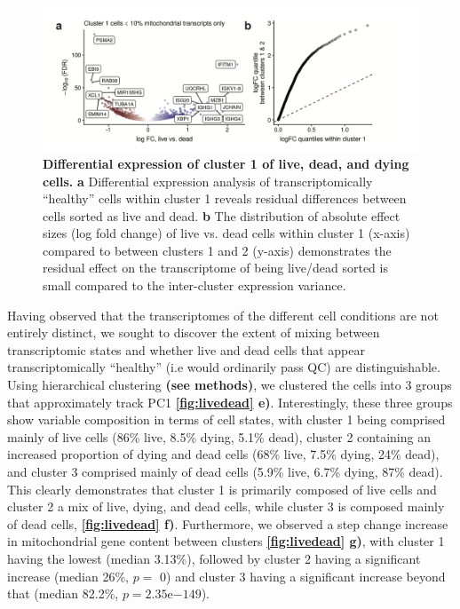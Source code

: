 \begin{figure}
	\centering
	\includegraphics[width=\textwidth]{Figures/chap3/livedead2.png}
	\caption[Differential expression of cluster 1 of live, dead, and dying cells.]
	{\small
	 \textbf{Differential expression of cluster 1 of live, dead, and dying cells.}
    \textbf{a} Differential expression analysis of transcriptomically ``healthy'' cells within cluster 1 reveals residual differences between cells sorted as live and dead.
    \textbf{b} The distribution of absolute effect sizes (log fold change) of live vs. dead cells within cluster 1 (x-axis) compared to between clusters 1 and 2 (y-axis) demonstrates the residual effect on the transcriptome of being live/dead sorted is small compared to the inter-cluster expression variance.}
	\label{fig:livedead2}

\end{figure}

Having observed that the transcriptomes of the different cell conditions are not entirely distinct, we sought to discover the extent of mixing between transcriptomic states and whether live and dead cells that appear transcriptomically ``healthy'' (i.e would ordinarily pass QC) are distinguishable. Using hierarchical clustering \textbf{(see methods)}, we clustered the cells into 3 groups  that approximately track PC1  \textbf{\autoref{fig:livedead} e)}. Interestingly, these three groups show variable composition in terms of cell states, with cluster 1 being comprised mainly of live cells (86\% live, 8.5\% dying, 5.1\% dead), cluster 2 containing an increased proportion of dying and dead cells (68\% live, 7.5\% dying, 24\% dead), and cluster 3 comprised mainly of dead cells (5.9\% live, 6.7\% dying, 87\% dead). This clearly demonstrates that cluster 1 is primarily composed of live cells and cluster 2 a mix of live, dying, and dead cells, while cluster 3 is composed mainly of dead cells, \textbf{\autoref{fig:livedead} f)}. Furthermore, we observed a step change increase in mitochondrial gene content between clusters \textbf{\autoref{fig:livedead} g)}, with cluster 1 having the lowest (median 3.13\%), followed by cluster 2 having a significant increase (median  26\%, $p=$ 0) and cluster 3 having a significant increase beyond that (median 82.2\%, $p=2.35\mathrm{e}{-149}$). 

